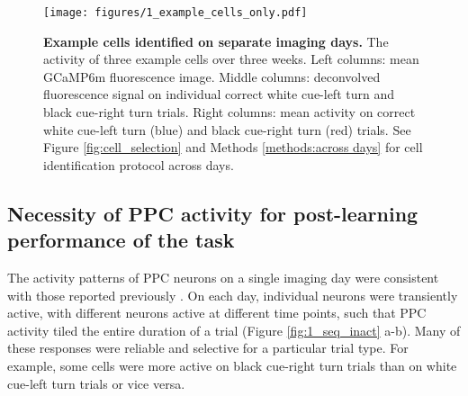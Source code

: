 \begin{figure}
\texttt{[image: figures/1\_example\_cells\_only.pdf]}
\caption[Example cells identified on separate imaging days.]{\textbf{Example cells identified on separate imaging days.} The activity of three example cells over three weeks. Left columns: mean GCaMP6m fluorescence image. Middle columns: deconvolved fluorescence signal on individual correct white cue-left turn and black cue-right turn trials. Right columns: mean activity on correct white cue-left turn (blue) and black cue-right turn (red) trials. See Figure \ref{fig:cell_selection} and Methods \ref{methods:across days} for cell identification protocol across days. 
\label{fig:1_example_cells_only}}
\end{figure}

\subsection{Necessity of PPC activity for post-learning performance of the task} \label{sec:chap3_necessity}

The activity patterns of PPC neurons on a single imaging day were consistent with those reported previously \citep{Harvey:2012du, Morcos2016}. On each day, individual neurons were transiently active, with different neurons active at different time points, such that PPC activity tiled the entire duration of a trial (Figure \ref{fig:1_seq_inact} a-b). Many of these responses were reliable and selective for a particular trial type. For example, some cells were more active on black cue-right turn trials than on white cue-left turn trials or vice versa.

